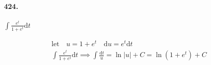    \paragraph*{424.}
    $\int\frac{e^t}{1+e^t}\mathrm{d}t$

    \begin{mdframed}
        \begin{equation*}
            \begin{gathered}
                \text{let} \quad u = 1 + e^t \quad \mathrm{d}u = e^t \mathrm{d}t \\
                \int\frac{e^t}{1+e^t}\mathrm{d}t \implies \int\frac{\mathrm{d}t}{u} = \ln|u| + C = \boxed{\ln(1+e^t) + C}
            \end{gathered}
        \end{equation*}
    \end{mdframed}

